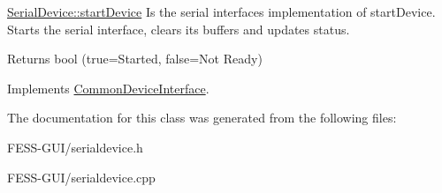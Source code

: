 \hyperlink{class_serial_device_a6940a33b7c8f4b83438d16cfa7d8d3ff}{Serial\+Device\+::start\+Device} Is the serial interface\textquotesingle{}s implementation of start\+Device. Starts the serial interface, clears its buffers and updates status. 

\begin{DoxyReturn}{Returns}
bool (true=Started, false=Not Ready) 
\end{DoxyReturn}


Implements \hyperlink{class_common_device_interface}{Common\+Device\+Interface}.



The documentation for this class was generated from the following files\+:\begin{DoxyCompactItemize}
\item 
F\+E\+S\+S-\/\+G\+U\+I/serialdevice.\+h\item 
F\+E\+S\+S-\/\+G\+U\+I/serialdevice.\+cpp\end{DoxyCompactItemize}
